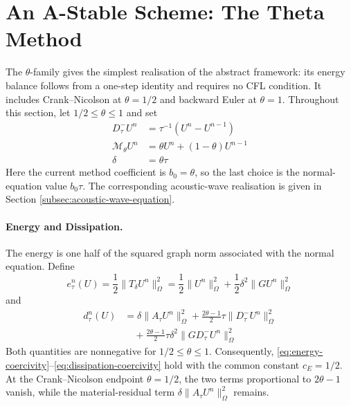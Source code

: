 \documentclass[11pt]{article}
\begin{document}
\section{An A-Stable Scheme: The Theta Method}
\label{sec:theta-method}
The \(\theta\)-family gives the simplest realisation of the abstract framework: its
energy balance follows from a one-step identity and requires no CFL condition.
It includes Crank--Nicolson at \(\theta=1/2\) and backward Euler at
\(\theta=1\). Throughout this section, let \(1/2\le\theta\le1\) and set
\begin{align}
D_{\tau}^{-}U^n&=\tau^{-1}(U^n-U^{n-1}) \label{eq:theta-time-difference}\\
\mathcal M_{\theta}U^n&=\theta U^n+(1-\theta)U^{n-1} \label{eq:theta-method-average}\\
\delta&=\theta\tau \label{eq:theta-stabilisation-parameter}
\end{align}
Here the current method coefficient is \(b_0=\theta\), so the last choice is
the normal-equation value \(b_0\tau\). The corresponding acoustic-wave
realisation is given in Section \ref{subsec:acoustic-wave-equation}.

\paragraph{Energy and Dissipation.}
The energy is one half of the squared graph norm associated with the normal
equation.
Define
\begin{equation}
e_{\tau}^n(U)=\frac12\|T_{\delta}U^n\|_{\Omega}^2
=\frac12\|U^n\|_{\Omega}^2
+\frac12\delta^2\|GU^n\|_{\Omega}^2 \label{eq:theta-energy}
\end{equation}
and
\begin{align}
d_{\tau}^n(U)
&=\delta\|A_{\tau}U^n\|_{\Omega}^2
+\frac{2\theta-1}{2}\tau\|D_{\tau}^{-}U^n\|_{\Omega}^2 \label{eq:theta-dissipation-solution}\\
&\quad+\frac{2\theta-1}{2}\tau\delta^2
\|GD_{\tau}^{-}U^n\|_{\Omega}^2 \label{eq:theta-dissipation-graph}
\end{align}
Both quantities are nonnegative for \(1/2\le\theta\le1\). Consequently,
\eqref{eq:energy-coercivity}--\eqref{eq:dissipation-coercivity} hold with the
common constant \(c_E=1/2\). At the Crank--Nicolson endpoint \(\theta=1/2\),
the two terms proportional to \(2\theta-1\) vanish, while the material-residual term
\(\delta\|A_{\tau}U^n\|_{\Omega}^2\) remains.
\end{document}
